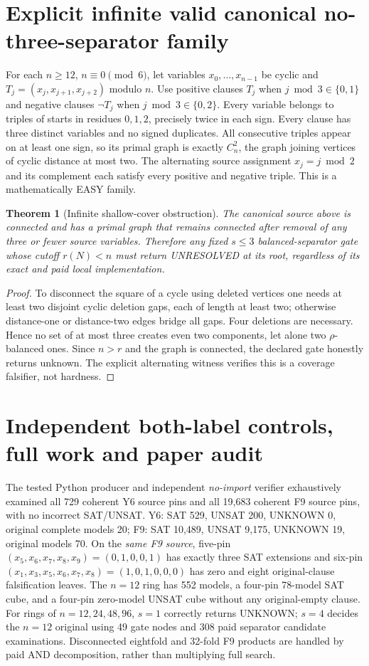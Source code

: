 \documentclass[11pt]{article}
\newtheorem{theorem}{Theorem}
\begin{document}
\section{Explicit infinite valid canonical no-three-separator family}
For each $n\ge12$, $n\equiv0\pmod6$, let variables $x_0,\ldots,x_{n-1}$ be cyclic and $T_j=(x_j,x_{j+1},x_{j+2})$ modulo $n$. Use positive clauses $T_j$ when $j\bmod3\in\{0,1\}$ and negative clauses $\neg T_j$ when $j\bmod3\in\{0,2\}$. Every variable belongs to triples of starts in residues $0,1,2$, precisely twice in each sign. Every clause has three distinct variables and no signed duplicates. All consecutive triples appear on at least one sign, so its primal graph is exactly $C_n^2$, the graph joining vertices of cyclic distance at most two. The alternating source assignment $x_j=j\bmod2$ and its complement each satisfy every positive and negative triple. This is a mathematically EASY family.

\begin{theorem}[Infinite shallow-cover obstruction]
The canonical source above is connected and has a primal graph that remains connected after removal of any three or fewer source variables. Therefore any fixed $s\le3$ balanced-separator gate whose cutoff $r(N)<n$ must return UNRESOLVED at its root, regardless of its exact and paid local implementation.
\end{theorem}
\begin{proof}
To disconnect the square of a cycle using deleted vertices one needs at least two disjoint cyclic deletion gaps, each of length at least two; otherwise distance-one or distance-two edges bridge all gaps. Four deletions are necessary. Hence no set of at most three creates even two components, let alone two $\rho$-balanced ones. Since $n>r$ and the graph is connected, the declared gate honestly returns unknown. The explicit alternating witness verifies this is a coverage falsifier, not hardness. \end{proof}

\section{Independent both-label controls, full work and paper audit}
The tested Python producer and independent \emph{no-import} verifier exhaustively examined all 729 coherent Y6 source pins and all 19,683 coherent F9 source pins, with no incorrect SAT/UNSAT. Y6: SAT 529, UNSAT 200, UNKNOWN 0, original complete models 20; F9: SAT 10,489, UNSAT 9,175, UNKNOWN 19, original models 70. On the \emph{same F9 source}, five-pin $(x_5,x_6,x_7,x_8,x_9)=(0,1,0,0,1)$ has exactly three SAT extensions and six-pin $(x_1,x_3,x_5,x_6,x_7,x_8)=(1,0,1,0,0,0)$ has zero and eight original-clause falsification leaves. The $n=12$ ring has 552 models, a four-pin 78-model SAT cube, and a four-pin zero-model UNSAT cube without any original-empty clause. For rings of $n=12,24,48,96$, $s=1$ correctly returns UNKNOWN; $s=4$ decides the $n=12$ original using 49 gate nodes and 308 paid separator candidate examinations. Disconnected eightfold and 32-fold F9 products are handled by paid AND decomposition, rather than multiplying full search.
\end{document}
